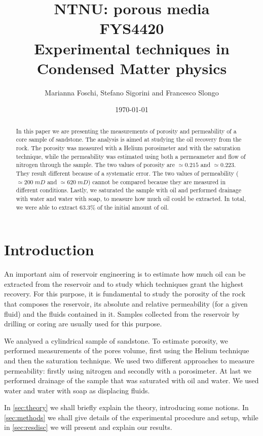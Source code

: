 \documentclass[10pt, a4paper]{amsart}
\title[NTNU: porous media]{NTNU: porous media\\\hrulefill\;\;FYS4420\;\;\hrulefill\\
Experimental techniques in Condensed Matter physics}
\author[Foschi, Sigorini \& Slongo]{Marianna Foschi, Stefano Sigorini and Francesco Slongo}
\date{\today}
\begin{document}
\onehalfspacing

\begin{titlepage}
\begin{abstract}
    In this paper we are presenting the measurements of porosity and permeability of a core sample of sandstone. The analysis is aimed at studying the oil recovery from the rock. The porosity was measured with a Helium porosimeter and with the saturation technique, while the permeability was estimated using both a permeameter and flow of nitrogen through the sample. The two values of porosity are $\simeq0.215$ and $\simeq0.223$. They result different because of a systematic error. The two values of permeability ($\simeq 200\;mD$ and $\simeq620\;mD$) cannot be compared because they are measured in different conditions. Lastly, we saturated the sample with oil and performed drainage with water and water with soap, to measure how much oil could be extracted. In total, we were able to extract $63.3\%$ of the initial amount of oil.
\end{abstract}
\maketitle
\end{titlepage}

\section{Introduction}

An important aim of reservoir engineering is to estimate how much oil can be extracted from the reservoir and to study which techniques grant the highest recovery. For this purpose, it is fundamental to study the porosity of the rock that composes the reservoir, its absolute and relative permeability (for a given fluid) and the fluids contained in it. Samples collected from the reservoir by drilling or coring are usually used for this purpose.

We analysed a cylindrical sample of sandstone. To estimate porosity, we performed measurements of the pores volume, first using the Helium technique and then the saturation technique. We used two different approaches to measure permeability: firstly using nitrogen and secondly with a porosimeter. At last we performed drainage of the sample that was saturated with oil and water. We used water and water with soap as displacing fluids.

In \cref{sec:theory} we shall briefly explain the theory, introducing some notions. In \cref{sec:methods} we shall give details of the experimental procedure and setup, while in \cref{sec:resdisc} we will present and explain our results.
\end{document}

